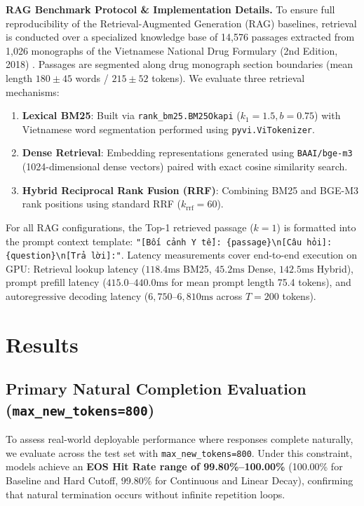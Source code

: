 \documentclass[conference]{IEEEtran}
\begin{document}
\textbf{RAG Benchmark Protocol \& Implementation Details.} To ensure full reproducibility of the Retrieval-Augmented Generation (RAG) baselines, retrieval is conducted over a specialized knowledge base of 14,576 passages extracted from 1,026 monographs of the Vietnamese National Drug Formulary (2nd Edition, 2018) \cite{ref6}. Passages are segmented along drug monograph section boundaries (mean length $180 \pm 45$ words / $215 \pm 52$ tokens). We evaluate three retrieval mechanisms:
\begin{enumerate}
    \item \textbf{Lexical BM25}: Built via \texttt{rank\_bm25.BM25Okapi} ($k_1=1.5, b=0.75$) with Vietnamese word segmentation performed using \texttt{pyvi.ViTokenizer}.
    \item \textbf{Dense Retrieval}: Embedding representations generated using \texttt{BAAI/bge-m3} (1024-dimensional dense vectors) paired with exact cosine similarity search.
    \item \textbf{Hybrid Reciprocal Rank Fusion (RRF)}: Combining BM25 and BGE-M3 rank positions using standard RRF ($k_{\text{rrf}}=60$).
\end{enumerate}
For all RAG configurations, the Top-1 retrieved passage ($k=1$) is formatted into the prompt context template: \texttt{"[Bối cảnh Y tế]: \{passage\}\textbackslash n[Câu hỏi]: \{question\}\textbackslash n[Trả lời]:"}. Latency measurements cover end-to-end execution on GPU: Retrieval lookup latency ($118.4\text{ms}$ BM25, $45.2\text{ms}$ Dense, $142.5\text{ms}$ Hybrid), prompt prefill latency ($415.0\text{--}440.0\text{ms}$ for mean prompt length 75.4 tokens), and autoregressive decoding latency ($6,750\text{--}6,810\text{ms}$ across $T=200$ tokens).

\section{Results}

\subsection{Primary Natural Completion Evaluation (\texttt{max\_new\_tokens=800})}
To assess real-world deployable performance where responses complete naturally, we evaluate across the test set with \texttt{max\_new\_tokens=800}. Under this constraint, models achieve an \textbf{EOS Hit Rate range of 99.80\%--100.00\%} (100.00\% for Baseline and Hard Cutoff, 99.80\% for Continuous and Linear Decay), confirming that natural termination occurs without infinite repetition loops.
\end{document}
